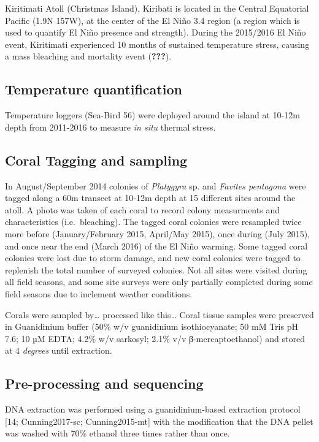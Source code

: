 \documentclass[]{article}
\begin{document}
Kiritimati Atoll (Christmas Island), Kiribati is located in the Central
Equatorial Pacific (1.9N 157W), at the center of the El Niño 3.4 region
(a region which is used to quantify El Niño presence and strength).
During the 2015/2016 El Niño event, Kiritimati experienced 10 months of
sustained temperature stress, causing a mass bleaching and mortality
event (\textbf{???}).

\subsection{Temperature
quantification}\label{temperature-quantification}

Temperature loggers (Sea-Bird 56) were deployed around the island at
10-12m depth from 2011-2016 to measure \emph{in situ} thermal stress.

\subsection{Coral Tagging and
sampling}\label{coral-tagging-and-sampling}

In August/September 2014 colonies of \emph{Platygyra} sp. and
\emph{Favites pentagona} were tagged along a 60m transect at 10-12m
depth at 15 different sites around the atoll. A photo was taken of each
coral to record colony measurments and characteristics (i.e.~bleaching).
The tagged coral colonies were resampled twice more before
(January/February 2015, April/May 2015), once during (July 2015), and
once near the end (March 2016) of the El Niño warming. Some tagged coral
colonies were lost due to storm damage, and new coral colonies were
tagged to replenish the total number of surveyed colonies. Not all sites
were visited during all field seasons, and some site surveys were only
partially completed during some field seasons due to inclement weather
conditions.

Corals were sampled by\ldots{} processed like this\ldots{} Coral tissue
samples were preserved in Guanidinium buffer (50\% w/v guanidinium
isothiocyanate; 50 mM Tris pH 7.6; 10 µM EDTA; 4.2\% w/v sarkosyl; 2.1\%
v/v β-mercaptoethanol) and stored at 4 \emph{degrees} until extraction.

\subsection{Pre-processing and
sequencing}\label{pre-processing-and-sequencing}

DNA extraction was performed using a guanidinium-based extraction
protocol {[}14; Cunning2017-sc; Cunning2015-mt{]} with the modification
that the DNA pellet was washed with 70\% ethanol three times rather than
once.
\end{document}
